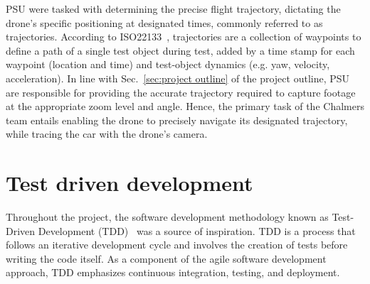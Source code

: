 PSU were tasked with determining the precise flight trajectory, dictating the drone's specific positioning at designated times, commonly referred to as trajectories.
According to ISO22133~\cite{iso22133}, trajectories are a collection of waypoints to define a path of a single test object during test, added by a time  stamp  for  each  waypoint (location  and  time) and test-object dynamics   (e.g.   yaw,   velocity,   acceleration). In line with Sec.~\ref{sec:project outline} of the project outline, PSU are responsible for providing the accurate trajectory required to capture footage at the appropriate zoom level and angle. Hence, the primary task of the Chalmers team entails enabling the drone to precisely navigate its designated trajectory, while  tracing the car with the drone's camera.


\section{Test driven development}
Throughout the project, the software development methodology known as Test-Driven Development (TDD)~\cite{TestDriven.ioWhatDevelopment} was a source of inspiration. TDD is a process that follows an iterative development cycle and involves the creation of tests before writing the code itself. As a component of the agile software development approach, TDD emphasizes continuous integration, testing, and deployment.
\\

